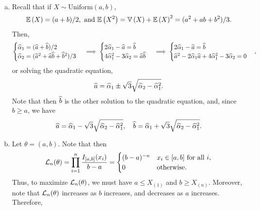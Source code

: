 \begin{ex}~
  \begin{enumerate}[(a)]
    \item Recall that if $X\sim\text{Uniform}(a, b)$,
          \[
            \mathbb{E}\left(X\right)=(a+b)/2,\text{ and } \mathbb{E}\left(X^2\right)=\mathbb{V}\left(X\right)+\mathbb{E}\left(X\right)^2=(a^2+ab+b^2)/3.
          \]
          Then,
          \begin{align*}
            \begin{cases}
              \widehat{\alpha}_1 = (\widehat{a} + \widehat{b})/2                 \\
              \widehat{\alpha}_2 = (\widehat{a}^2 + \widehat{a}\widehat{b} +\widehat{b}^2)/3 \\
            \end{cases}\implies
            \begin{cases}
              2\widehat{\alpha}_1 - \widehat{a} = \widehat{b}              \\
              4\widehat{\alpha}_1^2 -3\widehat{\alpha}_2 = \widehat{a}\widehat{b} \\
            \end{cases}\implies
            \begin{cases}
              2\widehat{\alpha}_1 - \widehat{a} = \widehat{b}                            \\
              \widehat{a}^2-2\widehat{\alpha}_1\widehat{a}+4\widehat{\alpha}_1^2-3\widehat{\alpha}_2=0 \\
            \end{cases},
          \end{align*}
          or solving the quadratic equation,
          \[
            \widehat{a}=\widehat{\alpha}_1\pm \sqrt{3}\sqrt{\widehat{\alpha}_2-\widehat{\alpha}_1^2}.
          \]
          Note that then $\widehat{b}$ is the other solution to the quadratic
          equation, and, since $b\geq a$, we have
          \[
            \widehat{a}=\widehat{\alpha}_1- \sqrt{3}\sqrt{\widehat{\alpha}_2-\widehat{\alpha}_1^2},
            \quad
            \widehat{b}=\widehat{\alpha}_1+ \sqrt{3}\sqrt{\widehat{\alpha}_2-\widehat{\alpha}_1^2}.
          \]
    \item Let $\theta=(a,b)$. Note that then
          \[
            \mathcal{L}_n(\theta)=\prod_{i=1}^n \frac{I_{[a, b]}(x_i)}{b-a}
            =\begin{cases}
              (b-a)^{-n} & \text{$x_i\in [a, b]$ for all $i$}, \\
              0          & \text{otherwise}.
            \end{cases}
          \]
          Thus, to maximize $\mathcal{L}_n(\theta)$, we must have $a\leq X_{(1)}$ and
          $b\geq X_{(n)}$. Moreover, note that $\mathcal{L}_n(\theta)$ increases as $b$
          increases, and decreases as $a$ increases. Therefore,

\end{enumerate}
\end{ex}
